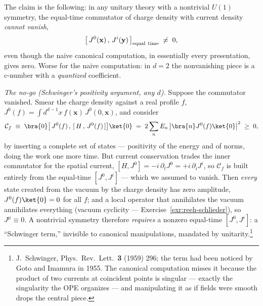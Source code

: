 \begin{eexample}
\label{ex:schwinger-term}
The claim is the following: in any unitary theory with a nontrivial
$U(1)$ symmetry, the equal-time commutator of charge density with current
density \emph{cannot vanish},
\begin{equation}
\big[\, J^0(\mathbf{x})\,,\, J^i(\mathbf{y})\,\big]_{\rm equal\ time} \;\ne\; 0,
\end{equation}
even though the naive canonical computation, in essentially every
presentation, gives zero. Worse for the naive computation: in $d = 2$ the
nonvanishing piece is a c-number with a \emph{quantized} coefficient.

\emph{The no-go (Schwinger's positivity argument, any $d$).} Suppose the
commutator vanished. Smear the charge density against a real profile $f$,
$J^0(f) = \int d^{d-1}x\, f(\mathbf{x})\, J^0(0,\mathbf{x})$, and consider
\begin{equation}
\mathcal{C}_f \;\equiv\;
\bra{0}\big[\, J^0(f)\,,\, [\, H\,,\, J^0(f)\,]\big]\ket{0}
\;=\; 2\sum_n E_n\, \big|\bra{n} J^0(f)\ket{0}\big|^2 \;\ge\; 0,
\label{eq:schwinger-positivity}
\end{equation}
by inserting a complete set of states --- positivity of the energy and of
norms, doing the work one more time. But current conservation trades the
inner commutator for the spatial current, $[H, J^0] = -i\,\partial_t J^0 =
+i\,\partial_i J^i$, so $\mathcal{C}_f$ is built entirely from the equal-time
$[J^0, J^i]$ --- which we assumed to vanish. Then \emph{every} state created
from the vacuum by the charge density has zero amplitude, $J^0(f)\ket{0} = 0$
for all $f$; and a local operator that annihilates the vacuum annihilates
everything (vacuum cyclicity --- Exercise~\ref{exr:reeh-schlieder}), so
$J^\mu \equiv 0$. A nontrivial symmetry therefore \emph{requires} a nonzero
equal-time $[J^0, J^i]$: a ``Schwinger term,'' invisible to canonical
manipulations, mandated by unitarity.\footnote{J.~Schwinger, Phys.\ Rev.\
Lett.\ \textbf{3} (1959) 296; the term had been noticed by Goto and Imamura
in 1955. The canonical computation misses it because the product of two
currents at coincident points is singular --- exactly the singularity the
OPE organizes --- and manipulating it as if fields were smooth drops the
central piece.}


\end{eexample}

